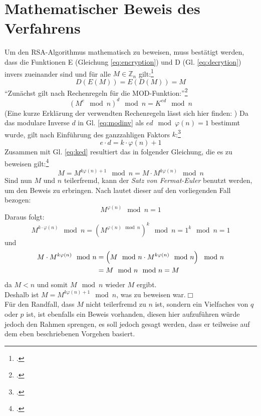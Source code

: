 \documentclass{scrarticle}
\begin{document}
    \section{Mathematischer Beweis des Verfahrens}
        Um den RSA-Algorithmus mathematisch zu beweisen, muss bestätigt werden, dass die Funktionen E (Gleichung \ref{eq:encryption}) und D (Gl. \ref{eq:decrytion}) invers zueinander sind und für alle $M\in\mathbb{Z}_n$ gilt:\footcite[vgl.][78]{ertel2003}
        \begin{equation}
            D(E(M)) = E(D(M)) = M
        \end{equation}
        \enquote{Zunächst gilt nach Rechenregeln für die MOD-Funktion:}\footcite[282]{dankmeier2006}
        \begin{equation}
            \left(M^{e}\mod{n}\right)^{d}\mod{n} = K^{ed}\mod{n} \label{eq:ked}
        \end{equation}
        (Eine kurze Erklärung der verwendten Rechenregeln lässt sich hier finden: \cite{modpot})
        Da das modulare Inverse $d$ in Gl. \ref{eq:modinv} als $ed\mod{\varphi(n)}=1$ bestimmt wurde, gilt nach Einführung des ganzzahligen Faktors $k$:\footcite[vgl.][72]{watjen2008}
        \begin{equation}
            e\cdot d = k\cdot \varphi(n)+1
        \end{equation}
        Zusammen mit Gl. \ref{eq:ked} resultiert das in folgender Gleichung, die es zu beweisen gilt:\footcite[vgl.][282]{dankmeier2006}
        \begin{equation}
           M = M^{k\varphi(n)+1}\mod{n} = M\cdot M^{k\varphi(n)}\mod{n}
        \end{equation}
        Sind nun $M$ und $n$ teilerfremd, kann der \emph{Satz von Fermat-Euler} benutzt werden, um den Beweis zu erbringen. Nach \cite[390]{bronstejn2016} lautet dieser auf den vorliegenden Fall bezogen:
        \begin{equation}
            M^{\varphi(n)} \mod{n} = 1
        \end{equation}
        Daraus folgt:  
        \begin{equation}
            M^{k \cdot \varphi(n)} \mod{n} = \left(M^{\varphi(n)\mod{n}}\right)^{k} \mod{n} = 1^{k}\mod{n} = 1
        \end{equation}
        und
        \begin{align}
            M\cdot M^{k\varphi(n)}\mod{n} &= \left(M\mod{n}\cdot M^{k\varphi(n)}\mod{n}\right)\mod{n}\\
             &= M\mod{n}\mod{n} = M \notag
        \end{align}
        da $M < n$ und somit $M\mod{n}$ wieder $M$ ergibt.\\
        Deshalb ist $M = M^{k\varphi(n)+1}\mod{n}$, was zu beweisen war.$\Box$ \\
        Für den Randfall, dass $M$ nicht teilerfremd zu $n$ ist, sondern ein Vielfaches von $q$ oder $p$ ist, ist ebenfalls ein Beweis vorhanden, diesen hier aufzuführen würde jedoch den Rahmen sprengen, es soll jedoch gesagt werden, dass er teilweise auf dem eben beschriebenen Vorgehen basiert.
        
\end{document}
